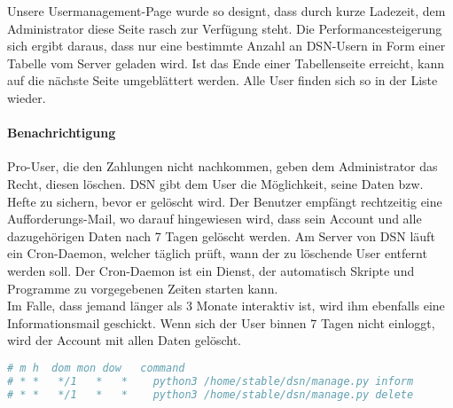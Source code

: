 
Unsere Usermanagement-Page wurde so designt, dass durch kurze Ladezeit, dem Administrator diese Seite rasch zur Verfügung steht. Die Performancesteigerung sich ergibt daraus, dass nur eine bestimmte Anzahl an DSN-Usern in Form einer Tabelle vom Server geladen wird. Ist das Ende einer Tabellenseite erreicht, kann auf die nächste Seite umgeblättert werden. Alle User finden sich so in der Liste wieder.

\paragraph{Benachrichtigung}
Pro-User, die den Zahlungen nicht nachkommen, geben dem Administrator das Recht, diesen löschen. DSN gibt dem User die Möglichkeit, seine Daten bzw. Hefte zu sichern, bevor er gelöscht wird. Der Benutzer empfängt rechtzeitig eine Aufforderungs-Mail, wo darauf hingewiesen wird, dass sein Account und alle dazugehörigen Daten nach 7 Tagen gelöscht werden. Am Server von DSN läuft ein Cron-Daemon, welcher täglich prüft, wann der zu löschende User entfernt werden soll. \grqq{}Der Cron-Daemon ist ein Dienst, der automatisch Skripte und Programme zu vorgegebenen Zeiten starten kann.\grqq{}\cite{CRON}\\
Im Falle, dass jemand länger als 3 Monate interaktiv ist, wird ihm ebenfalls eine Informationsmail geschickt. Wenn sich der User binnen 7 Tagen nicht einloggt, wird der Account mit allen Daten gelöscht. \cite{COMMANDS}\cite{CRON}

\begin{lstlisting}[caption={Cronjob für die {\"U}berpr{\"u}fung der Inaktivt{\"a}t und L{\"o}schung}, language=bash]
# m h  dom mon dow   command
# * *   */1   *   *    python3 /home/stable/dsn/manage.py inform
# * *   */1   *   *    python3 /home/stable/dsn/manage.py delete
\end{lstlisting}